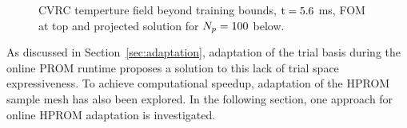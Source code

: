 \begin{figure}
	\begin{minipage}{0.99\linewidth}
	\end{minipage}
    \begin{minipage}{0.99\linewidth}
	\end{minipage}
    \caption{\label{fig:cvrcStaticTempProjSlice}CVRC temperture field beyond training bounds, $\text{t} = 5.6$ ms, FOM at top and projected solution for $N_p = 100$ below.}
\end{figure}

As discussed in Section~\ref{sec:adaptation}, adaptation of the trial basis during the online PROM runtime proposes a solution to this lack of trial space expressiveness. To achieve computational speedup, adaptation of the HPROM sample mesh has also been explored. In the following section, one approach for online HPROM adaptation is investigated. 